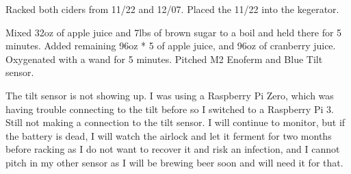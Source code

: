 \def\todaysdate{20210108}
\newday{\todaysdate}\label{\todaysdate}


\begin{my_itemize}
    \item Racked both ciders from 11/22 and 12/07.  Placed the 11/22 into the kegerator.
\end{my_itemize}

\def\todaysdate{20210530}
\newday{\todaysdate}\label{\todaysdate}


\begin{my_itemize}
    \item Mixed 32oz of apple juice and 7lbs of brown sugar to a boil and held there for 5 minutes.  Added remaining 96oz * 5 of apple juice, and 96oz of cranberry juice.  Oxygenated with a wand for 5 minutes.  Pitched M2 Enoferm and Blue Tilt sensor.
    \item The tilt sensor is not showing up.  I was using a Raspberry Pi Zero, which was having trouble connecting to the tilt before so I switched to a Raspberry Pi 3.  Still not making a connection to the tilt sensor.  I will continue to monitor, but if the battery is dead, I will watch the airlock and let it ferment for two months before racking as I do not want to recover it and risk an infection, and I cannot pitch in my other sensor as I will be brewing beer soon and will need it for that.
\end{my_itemize}
